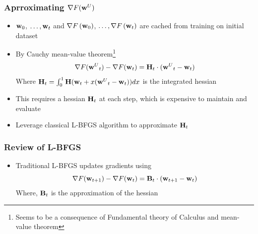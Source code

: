 \documentclass[pdf]{beamer}
\begin{document}
\begin{frame}
  \frametitle{Aprroximating $\nabla F({\textbf{w}^{U}})$}
  \begin{itemize}
    \item $\textbf{w}_{0}$, $\dots,\textbf{w}_{t}$ and $\nabla F\left(\textbf{w}_{0}\right)$, $\dots, \nabla F\left(\textbf{w}_{t}\right)$ are cached from training on initial dataset
    \item By Cauchy mean-value theorem\footnote<2->{Seems to be a consequence of Fundamental theory of Calculus and mean-value theorem}
    \[
      \nabla F({\textbf{w}^{U}}_{t}) - \nabla F(\textbf{w}_{t}) = \textbf{H}_{t} \cdot ({\textbf{w}^{U}}_{t} - \textbf{w}_{t}) 
    \]
    Where $\textbf{H}_{t} = \int_{0}^{1}\textbf{H}(\textbf{w}_{t}+x({\textbf{w}^{U}}_{t}-\textbf{w}_{t}))dx$ is the integrated hessian
    \item This requires a hessian $\textbf{H}_{t}$ at each step, which is expensive to maintain and evaluate
    \item Leverage classical L-BFGS algorithm to approximate $\textbf{H}_{t}$
  \end{itemize}
\end{frame}

\begin{frame}
  \frametitle{Review of L-BFGS}
  \begin{itemize}
    \item Traditional L-BFGS updates gradients using
    \[\nabla F(\textbf{w}_{t+1}) - \nabla F(\textbf{w}_{t})  = \textbf{B}_{t} \cdot (\textbf{w}_{t+1}-\textbf{w}_{t}) \]
    Where, $\textbf{B}_t$ is the approximation of the hessian
  \end{itemize}
  \vfill
  \hfill%
\end{frame}
\end{document}
